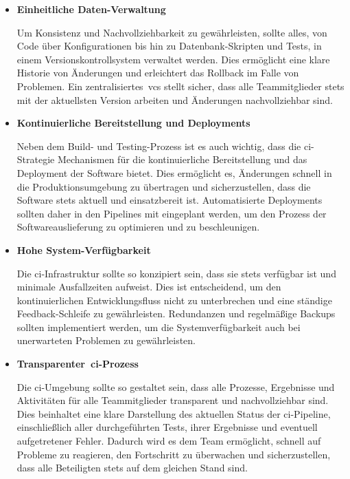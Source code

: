 \begin{itemize}
    \item {
        \textbf{Einheitliche Daten-Verwaltung}\par
        Um Konsistenz und Nachvollziehbarkeit zu gewährleisten, sollte alles, von Code über Konfigurationen bis hin
        zu Datenbank-Skripten und Tests, in einem Versionskontrollsystem verwaltet werden.
        Dies ermöglicht eine klare Historie von Änderungen und erleichtert das Rollback im Falle von Problemen.
        Ein zentralisiertes\ \acrshort{vcs} stellt sicher, dass alle Teammitglieder stets mit der aktuellsten Version
        arbeiten und Änderungen nachvollziehbar sind.
    }

    \item {
        \textbf{Kontinuierliche Bereitstellung und Deployments}\par
        Neben dem Build- und Testing-Prozess ist es auch wichtig, dass die \acrshort{ci}-Strategie Mechanismen für die
        kontinuierliche Bereitstellung und das Deployment der Software bietet.
        Dies ermöglicht es, Änderungen schnell in die Produktionsumgebung zu übertragen und sicherzustellen, dass die
        Software stets aktuell und einsatzbereit ist.
        Automatisierte Deployments sollten daher in den Pipelines mit eingeplant werden, um den Prozess der
        Softwareauslieferung zu optimieren und zu beschleunigen.
    }

    \item {
        \textbf{Hohe System-Verfügbarkeit}\par
        Die \acrshort{ci}-Infrastruktur sollte so konzipiert sein, dass sie stets verfügbar ist und minimale Ausfallzeiten
        aufweist. Dies ist entscheidend, um den kontinuierlichen Entwicklungsfluss nicht zu unterbrechen und eine
        ständige Feedback-Schleife zu gewährleisten.
        Redundanzen und regelmäßige Backups sollten implementiert werden, um die Systemverfügbarkeit auch bei
        unerwarteten Problemen zu gewährleisten.
    }

    \item {
        \textbf{Transparenter\ \acrshort{ci}-Prozess}\par
        Die \acrshort{ci}-Umgebung sollte so gestaltet sein, dass alle Prozesse, Ergebnisse und Aktivitäten für alle
        Teammitglieder transparent und nachvollziehbar sind.
        Dies beinhaltet eine klare Darstellung des aktuellen Status der \acrshort{ci}-Pipeline, einschließlich aller
        durchgeführten Tests, ihrer Ergebnisse und eventuell aufgetretener Fehler.
        Dadurch wird es dem Team ermöglicht, schnell auf Probleme zu reagieren, den Fortschritt zu überwachen und
        sicherzustellen, dass alle Beteiligten stets auf dem gleichen Stand sind.
    }
\end{itemize}

